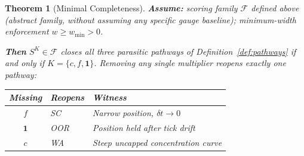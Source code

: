 \documentclass[11pt,a4paper]{article}
\theoremstyle{cgdefinition}
\theoremstyle{cgplain}
\newtheorem{theorem}{Theorem}
\theoremstyle{cgremark}
\begin{document}
\begin{theorem}[Minimal Completeness]\label{thm:mincomplete}
\textbf{Assume:} scoring family $\mathcal{F}$ defined above (abstract family, without assuming any specific gauge baseline); minimum-width enforcement $w \geq w_{\min} > 0$.

\textbf{Then} $S^K \in \mathcal{F}$ closes all three parasitic pathways of Definition~\ref{def:pathways} if and only if $K = \{c, f, \mathbf{1}\}$. Removing any single multiplier reopens exactly one pathway:
\begin{center}
\begin{tabular}{@{}cll@{}}
\toprule
Missing & Reopens & Witness \\
\midrule
$f$ & SC & Narrow position, $\delta t \to 0$ \\
$\mathbf{1}$ & OOR & Position held after tick drift \\
$c$ & WA & Steep uncapped concentration curve \\
\bottomrule
\end{tabular}
\end{center}
\end{theorem}
\end{document}
